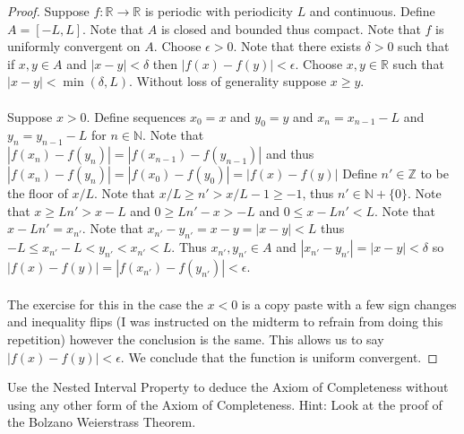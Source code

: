 \documentclass[12pt]{article}
\makeatletter
\theoremstyle{homework}
\newenvironment{exercise}[1]
{\def\@currentlabel{#1}\exercisecore}
{\endexercisecore}
\makeatother
\begin{document}
\begin{proof}
Suppose $f : \mathbb{R}\rightarrow\mathbb{R}$ is periodic with periodicity $L$ and continuous.  Define $A=[-L,L]$.  Note that $A$ is closed and bounded thus compact.  Note that $f$ is uniformly convergent on $A$.  Choose $\epsilon>0$.  Note that there exists $\delta>0$ such that if $x,y\in A$ and $|x-y|<\delta$ then $|f(x)-f(y)|<\epsilon$.  Choose $x,y\in\mathbb{R}$ such that $|x-y|<\min(\delta,L)$.  Without loss of generality suppose $x\geq y$.\\\\
Suppose $x>0$.  Define sequences $x_0=x$ and $y_0=y$ and $x_n=x_{n-1}-L$ and $y_n=y_{n-1}-L$ for $n\in\mathbb{N}$.  Note that $|f(x_n)-f(y_n)|=|f(x_{n-1})-f(y_{n-1})|$ and thus $|f(x_n)-f(y_n)|=|f(x_0)-f(y_0)|=|f(x)-f(y)|$  Define $n'\in\mathbb{Z}$ to be the floor of $x/L$.  Note that $x/L\geq n'>x/L-1\geq -1$, thus $n'\in\mathbb{N}+\{0\}$.  Note that $x\geq Ln'>x-L$ and $0\geq Ln'-x>-L$ and $0\leq x-Ln'<L$.  Note that $x-Ln'=x_{n'}$.  Note that $x_{n'}-y_{n'}=x-y=|x-y|<L$ thus $-L\leq x_{n'}-L<y_{n'}<x_{n'}<L$.  Thus $x_{n'},y_{n'}\in A$ and $|x_{n'}-y_{n'}|=|x-y|<\delta$ so $|f(x)-f(y)|=|f(x_{n'})-f(y_{n'})|<\epsilon$.\\\\
The exercise for this in the case the $x<0$ is a copy paste with a few sign changes and inequality flips (I was instructed on the midterm to refrain from doing this repetition) however the conclusion is the same.  This allows us to say $|f(x)-f(y)|<\epsilon$.  We conclude that the function is uniform convergent.
\end{proof}
\begin{exercise}
5
Use the Nested Interval Property to deduce the Axiom of Completeness without using any other form of the Axiom of Completeness.  Hint: Look at the proof of the Bolzano Weierstrass Theorem.
\end{exercise}
\end{document}
